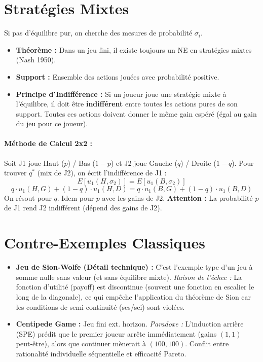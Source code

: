 \documentclass[10pt,a4paper]{article}
\begin{document}
\section{Stratégies Mixtes}
Si pas d'équilibre pur, on cherche des mesures de probabilité $\sigma_i$.
\begin{itemize}
    \item \textbf{Théorème :} Dans un jeu fini, il existe toujours un NE en stratégies mixtes (Nash 1950).
    \item \textbf{Support :} Ensemble des actions jouées avec probabilité positive.
    \item \textbf{Principe d'Indifférence :} Si un joueur joue une stratégie mixte à l'équilibre, il doit être \textbf{indifférent} entre toutes les actions pures de son support. Toutes ces actions doivent donner le même gain espéré (égal au gain du jeu pour ce joueur).
\end{itemize}

\paragraph{Méthode de Calcul 2x2 :}
Soit J1 joue Haut ($p$) / Bas ($1-p$) et J2 joue Gauche ($q$) / Droite ($1-q$).
Pour trouver $q^*$ (mix de J2), on écrit l'indifférence de J1 :
\[ E[u_1(H, \sigma_2)] = E[u_1(B, \sigma_2)] \]
\[ q \cdot u_1(H,G) + (1-q) \cdot u_1(H,D) = q \cdot u_1(B,G) + (1-q) \cdot u_1(B,D) \]
On résout pour $q$. Idem pour $p$ avec les gains de J2.
\textbf{Attention :} La probabilité $p$ de J1 rend J2 indifférent (dépend des gains de J2).

\section{Contre-Exemples Classiques}
\begin{itemize}
    \item \textbf{Jeu de Sion-Wolfe (Détail technique) :} C'est l'exemple type d'un jeu à somme nulle sans valeur (et sans équilibre mixte).
    \textit{Raison de l'échec :} La fonction d'utilité (payoff) est discontinue (souvent une fonction en escalier le long de la diagonale), ce qui empêche l'application du théorème de Sion car les conditions de semi-continuité (scs/sci) sont violées.
    \item \textbf{Centipede Game :} Jeu fini ext. horizon.
    \textit{Paradoxe :} L'induction arrière (SPE) prédit que le premier joueur arrête immédiatement (gains $(1,1)$ peut-être), alors que continuer mènerait à $(100,100)$. Conflit entre rationalité individuelle séquentielle et efficacité Pareto.
\end{itemize}
\end{document}
